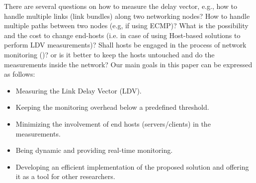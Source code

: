 \documentclass[10pt, journal, letterpaper]{IEEEtran}
\begin{document}
There are several questions on how to measure the delay vector, e.g., how to handle multiple links (link bundles) along two networking nodes? How to handle multiple paths between two nodes (e.g, if using ECMP)? What is the possibility and the cost to change end-hosts (i.e. in case of using Host-based solutions to perform LDV measurements)? Shall hosts be engaged in the process of network monitoring (\cite{guo2015pingmesh})? or is it better to keep the hosts untouched and do the measurements inside the network? Our main goals in this paper can be expressed as follows: 
\begin{itemize}
\item Measuring the Link Delay Vector (LDV). 
\item Keeping the monitoring overhead below a predefined threshold. 
\item Minimizing the involvement of end hosts (servers/clients) in the measurements.
\item Being dynamic and providing real-time monitoring. %
\item Developing an efficient implementation of the proposed solution and offering it as a tool for other researchers.
\end{itemize}
\end{document}
